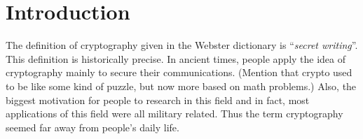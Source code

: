 \chapter{Introduction}
The definition of cryptography given in the Webster dictionary is ``\textit{secret writing}''. This definition is historically precise. In ancient times, people apply the idea of cryptography mainly to secure their communications. (Mention that crypto used to be like some kind of puzzle, but now more based on math problems.) Also, the biggest motivation for people to research in this field and in fact, most applications of this field were all military related. Thus the term cryptography seemed far away from people's daily life.
